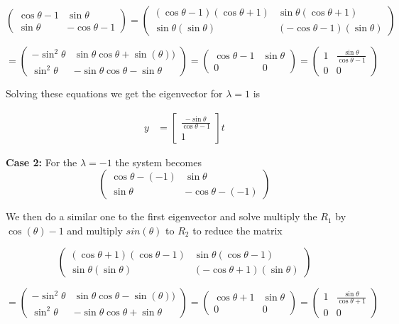 \documentclass{article}
\begin{document}
$$
\begin{pmatrix}
\cos \theta -1 & \sin \theta \\
\sin \theta & -\cos \theta - 1
\end{pmatrix} = 
\begin{pmatrix}
(\cos \theta -1)(\cos \theta +1) & \sin \theta (\cos \theta +1)\\
\sin \theta (\sin \theta) & (-\cos \theta -1)(\sin \theta)
\end{pmatrix} 
$$

$$
= \begin{pmatrix}
-\sin^2 \theta & \sin \theta \cos \theta + \sin(\theta))\\
\sin^2 \theta & -\sin \theta\cos \theta -\sin \theta
\end{pmatrix} =
\begin{pmatrix}
\cos \theta -1 & \sin \theta \\
0 & 0
\end{pmatrix} = 
\begin{pmatrix}
1 & \frac{\sin \theta}{\cos \theta -1} \\
0 & 0
\end{pmatrix}
$$

Solving these equations we get the eigenvector for $\lambda =1$ is 

\begin{align}
    y &= \begin{bmatrix}
           \frac{-\sin \theta }{\cos \theta -1} \\
           1
         \end{bmatrix}t 
\end{align}

\textbf{Case 2: }For the $\lambda =-1$ the system becomes
$$
\begin{pmatrix}
\cos \theta - (-1) & \sin \theta \\
\sin \theta & -\cos \theta -  (-1)
\end{pmatrix} 
$$

We then do a similar one to the first eigenvector and solve multiply the $R_1$ by $\cos(\theta) -1$ and multiply $sin(\theta)$ to $R_2$ to reduce the matrix

$$
\begin{pmatrix}
(\cos \theta + 1)(\cos \theta -1) & \sin \theta (\cos \theta - 1)\\
\sin \theta (\sin \theta) & (-\cos \theta +1)(\sin \theta)
\end{pmatrix} 
$$

$$
= \begin{pmatrix}
-\sin^2 \theta & \sin \theta \cos \theta - \sin(\theta))\\
\sin^2 \theta & -\sin \theta\cos \theta +\sin \theta
\end{pmatrix} =
\begin{pmatrix}
\cos \theta +1 & \sin \theta \\
0 & 0
\end{pmatrix} =
\begin{pmatrix}
1 & \frac{\sin \theta}{\cos \theta +1} \\
0 & 0
\end{pmatrix}
$$
\end{document}
